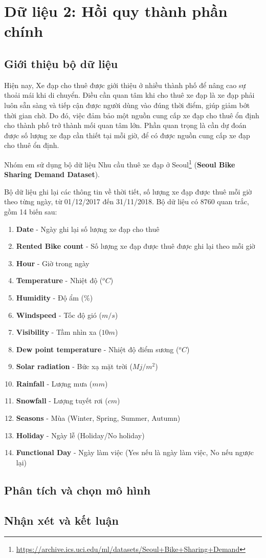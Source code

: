 \section{Dữ liệu 2: Hồi quy thành phần chính}

\subsection*{Giới thiệu bộ dữ liệu}
Hiện nay, Xe đạp cho thuê được giới thiệu ở nhiều thành phố để nâng cao sự thoải mái khi di chuyển. Điều cần quan tâm khi cho thuê xe đạp là xe đạp phải luôn sẵn sàng và tiếp cận được người dùng vào đúng thời điểm, giúp giảm bớt thời gian chờ. Do đó, việc đảm bảo một nguồn cung cấp xe đạp cho thuê ổn định cho thành phố trở thành mối quan tâm lớn. Phần quan trọng là cần dự đoán được số lượng xe đạp cần thiết tại mỗi giờ, để có được nguồn cung cấp xe đạp cho thuê ổn định.

Nhóm em sử dụng bộ dữ liệu Nhu cầu thuê xe đạp ở Seoul\footnote{\url{https://archive.ics.uci.edu/ml/datasets/Seoul+Bike+Sharing+Demand}} (\textbf{Seoul Bike Sharing Demand Dataset}).

Bộ dữ liệu ghi lại các thông tin về thời tiết, số lượng xe đạp được thuê mỗi giờ theo từng ngày, từ 01/12/2017 đến 31/11/2018. Bộ dữ liệu có 8760 quan trắc, gồm 14 biến sau:
\begin{enumerate}
	\item \textbf{Date} - Ngày ghi lại số lượng xe đạp cho thuê
	\item \textbf{Rented Bike count} - Số lượng xe đạp được thuê được ghi lại theo mỗi giờ
	\item \textbf{Hour} - Giờ trong ngày
	\item \textbf{Temperature} - Nhiệt độ ($^o C$)
	\item \textbf{Humidity} - Độ ẩm (\%)
	\item \textbf{Windspeed} - Tốc độ gió ($m/s$)
	\item \textbf{Visibility} - Tầm nhìn xa ($10m$)
	\item \textbf{Dew point temperature} - Nhiệt độ điểm sương ($^o C$)
	\item \textbf{Solar radiation} - Bức xạ mặt trời ($Mj/m^2$)
	\item \textbf{Rainfall} - Lượng mưa ($mm$)
	\item \textbf{Snowfall} - Lượng tuyết rơi ($cm$)
	\item \textbf{Seasons} - Mùa (Winter, Spring, Summer, Autumn)
	\item \textbf{Holiday} - Ngày lễ (Holiday/No holiday)
	\item \textbf{Functional Day} - Ngày làm việc (Yes nếu là ngày làm việc, No nếu ngược lại)
\end{enumerate}


\subsection*{Phân tích và chọn mô hình}

\subsection*{Nhận xét và kết luận}